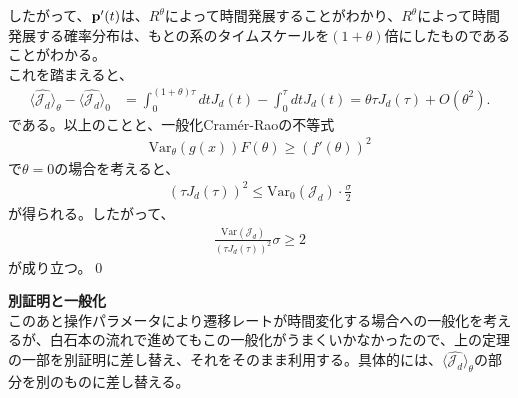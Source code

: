 \documentclass[a4paper,11pt]{jsarticle}
\numberwithin{equation}{section}
\begin{document}
したがって、$\vb{p}'(t)$は、$R^\theta$によって時間発展することがわかり、$R^\theta$によって時間発展する確率分布は、もとの系のタイムスケールを$(1+\theta)$倍にしたものであることがわかる。\\
これを踏まえると、
\begin{align}
    \langle \hat{\mathcal{J}_d} \rangle_\theta - \langle \hat{\mathcal{J}_d} \rangle_0 
    &= \int_0^{(1+\theta)\tau} dt J_d(t) - \int_0^\tau dt J_d(t) \nonumber =\theta \tau J_d(\tau) + O(\theta^2).
\end{align}
である。以上のことと、一般化Cram\'er-Raoの不等式
\begin{align}
    \text{Var}_{\theta}(g(x))F(\theta) \geq (f'(\theta))^2
\end{align}
で$\theta = 0$の場合を考えると、
\begin{align}
    (\tau J_d(\tau))^2 \leq \text{Var}_0(\mathcal{J}_d) \cdot \frac{\sigma}{2}
\end{align}
が得られる。したがって、
\begin{align}
    \frac{\text{Var}(\mathcal{J}_d)}{(\tau J_d(\tau))^2} \sigma \geq 2
\end{align}
が成り立つ。\qed

\textbf{別証明と一般化}\\
このあと操作パラメータにより遷移レートが時間変化する場合への一般化を考えるが、白石本の流れで進めてもこの一般化がうまくいかなかったので、上の定理の一部を別証明に差し替え、それをそのまま利用する。具体的には、$\langle \hat{\mathcal{J}_d} \rangle_\theta$の部分を別のものに差し替える。\\
\end{document}

